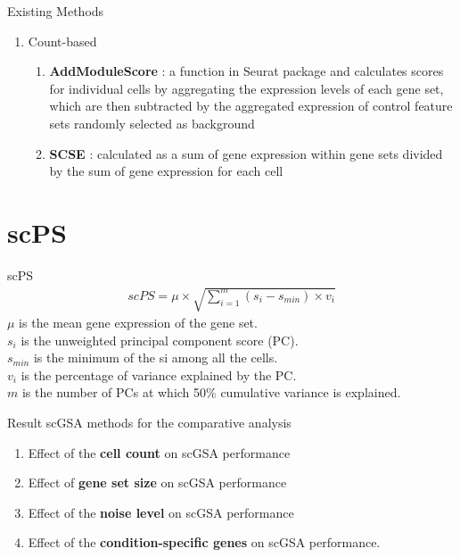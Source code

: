 \documentclass[12pt, aspectratio=43]{beamer}
\begin{document}
	
	\begin{frame}{Existing Methods}
		\begin{enumerate}
			\item Count-based
			\begin{enumerate}
				\item \textbf{AddModuleScore} : a function in Seurat package and calculates scores for individual cells by aggregating the expression levels of each gene set, which are then subtracted by the aggregated expression of control feature sets randomly selected as background
				\item \textbf{SCSE} : calculated as a sum of gene expression within gene sets divided by the sum of gene expression for each cell
			\end{enumerate}
		\end{enumerate}
	\end{frame}
	
	\section{scPS}
	
	\begin{frame}{scPS}
		\begin{align}
			scPS = \mu \times \sqrt{\sum^m_{i = 1}(s_i - s_{min})\times v_i}
		\end{align}
		$\mu$ is the mean gene expression of the gene set. \\
		$s_i$ is the unweighted principal component score (PC). \\
		$s_{min}$ is the minimum of the si among all the cells. \\
		$v_i$ is the percentage of variance explained by the PC. \\
		$m$ is the number of PCs at which 50$\%$ cumulative variance is explained.
	\end{frame}
	
	\begin{frame}{Result}
		scGSA methods for the comparative analysis
		\begin{enumerate}
			\item Effect of the \textbf{cell count} on scGSA performance
			\item Effect of \textbf{gene set size} on scGSA performance
			\item Effect of the \textbf{noise level} on scGSA performance
			\item Effect of the \textbf{condition-specific genes} on scGSA
			performance.
		\end{enumerate}
	\end{frame}
	
\end{document}
